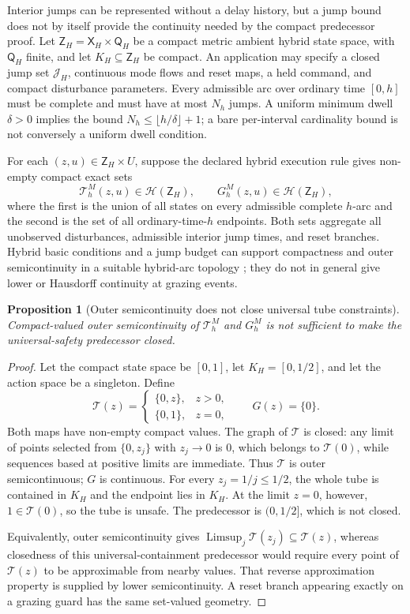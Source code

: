\documentclass[11pt]{article}
\newtheorem{proposition}{Proposition}
\theoremstyle{definition}
\begin{document}
Interior jumps can be represented without a delay history, but a jump bound
does not by itself provide the continuity needed by the compact predecessor
proof.  Let $\mathsf Z_H=\mathsf X_H\times\mathsf Q_H$ be a compact metric
ambient hybrid state space, with $\mathsf Q_H$ finite, and let
$K_H\subseteq\mathsf Z_H$ be compact.  An application may specify a closed
jump set $\mathcal J_H$, continuous mode flows and reset maps, a held command,
and compact disturbance parameters.  Every admissible arc over ordinary
time $[0,h]$ must be complete and must have at most $N_h$ jumps.  A uniform
minimum dwell $\delta>0$ implies the bound
$N_h\le\lfloor h/\delta\rfloor+1$; a bare per-interval cardinality bound is
not conversely a uniform dwell condition.

For each $(z,u)\in\mathsf Z_H\times U$, suppose the declared hybrid
execution rule gives non-empty compact exact sets
\[
\mathscr T_h^M(z,u)\in\mathcal H(\mathsf Z_H),
\qquad
G_h^M(z,u)\in\mathcal H(\mathsf Z_H),
\]
where the first is the union of all states on every admissible complete
$h$-arc and the second is the set of all ordinary-time-$h$ endpoints.  Both
sets aggregate all unobserved disturbances, admissible interior jump times,
and reset branches.  Hybrid basic conditions and a jump budget can support
compactness and outer semicontinuity in a suitable hybrid-arc topology
\cite{goebel2012}; they do not in general give lower or Hausdorff
continuity at grazing events.

\begin{proposition}[Outer semicontinuity does not close universal tube constraints]
\label{prop:osc-insufficient}
Compact-valued outer semicontinuity of $\mathscr T_h^M$ and $G_h^M$ is not
sufficient to make the universal-safety predecessor closed.
\end{proposition}

\begin{proof}
Let the compact state space be $[0,1]$, let $K_H=[0,1/2]$, and let the action
space be a singleton.  Define
\[
\mathscr T(z)=
\begin{cases}
\{0,z\},&z>0,\\
\{0,1\},&z=0,
\end{cases}
\qquad
G(z)=\{0\}.
\]
Both maps have non-empty compact values.  The graph of $\mathscr T$ is
closed: any limit of points selected from $\{0,z_j\}$ with $z_j\to0$ is
$0$, which belongs to $\mathscr T(0)$, while sequences based at positive
limits are immediate.  Thus $\mathscr T$ is outer semicontinuous; $G$ is
continuous.  For every $z_j=1/j\le1/2$, the whole tube is contained in
$K_H$ and the endpoint lies in $K_H$.  At the limit $z=0$, however,
$1\in\mathscr T(0)$, so the tube is unsafe.  The predecessor is
$(0,1/2]$, which is not closed.

Equivalently, outer semicontinuity gives
$\operatorname{Limsup}_j\mathscr T(z_j)\subseteq\mathscr T(z)$, whereas
closedness of this universal-containment predecessor would require every
point of $\mathscr T(z)$ to be approximable from nearby values.  That reverse
approximation property is supplied by lower semicontinuity.  A reset branch
appearing exactly on a grazing guard has the same set-valued geometry.
\end{proof}
\end{document}
